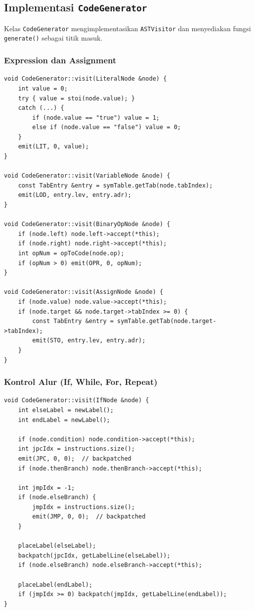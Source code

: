 \documentclass[12pt,a4paper]{article}
\begin{document}
\subsection{Implementasi \texttt{CodeGenerator}}

Kelas \texttt{CodeGenerator} mengimplementasikan \texttt{ASTVisitor} dan
menyediakan fungsi \texttt{generate()} sebagai titik masuk.

\subsubsection{Expression dan Assignment}

\begin{lstlisting}[style=cpp, caption={Implementasi ekspresi dan assignment}]
void CodeGenerator::visit(LiteralNode &node) {
    int value = 0;
    try { value = stoi(node.value); }
    catch (...) {
        if (node.value == "true") value = 1;
        else if (node.value == "false") value = 0;
    }
    emit(LIT, 0, value);
}

void CodeGenerator::visit(VariableNode &node) {
    const TabEntry &entry = symTable.getTab(node.tabIndex);
    emit(LOD, entry.lev, entry.adr);
}

void CodeGenerator::visit(BinaryOpNode &node) {
    if (node.left) node.left->accept(*this);
    if (node.right) node.right->accept(*this);
    int opNum = opToCode(node.op);
    if (opNum > 0) emit(OPR, 0, opNum);
}

void CodeGenerator::visit(AssignNode &node) {
    if (node.value) node.value->accept(*this);
    if (node.target && node.target->tabIndex >= 0) {
        const TabEntry &entry = symTable.getTab(node.target->tabIndex);
        emit(STO, entry.lev, entry.adr);
    }
}
\end{lstlisting}

\subsubsection{Kontrol Alur (If, While, For, Repeat)}

\begin{lstlisting}[style=cpp, caption={Implementasi IfNode dengan backpatching}]
void CodeGenerator::visit(IfNode &node) {
    int elseLabel = newLabel();
    int endLabel = newLabel();

    if (node.condition) node.condition->accept(*this);
    int jpcIdx = instructions.size();
    emit(JPC, 0, 0);  // backpatched
    if (node.thenBranch) node.thenBranch->accept(*this);

    int jmpIdx = -1;
    if (node.elseBranch) {
        jmpIdx = instructions.size();
        emit(JMP, 0, 0);  // backpatched
    }

    placeLabel(elseLabel);
    backpatch(jpcIdx, getLabelLine(elseLabel));
    if (node.elseBranch) node.elseBranch->accept(*this);

    placeLabel(endLabel);
    if (jmpIdx >= 0) backpatch(jmpIdx, getLabelLine(endLabel));
}
\end{lstlisting}
\end{document}
